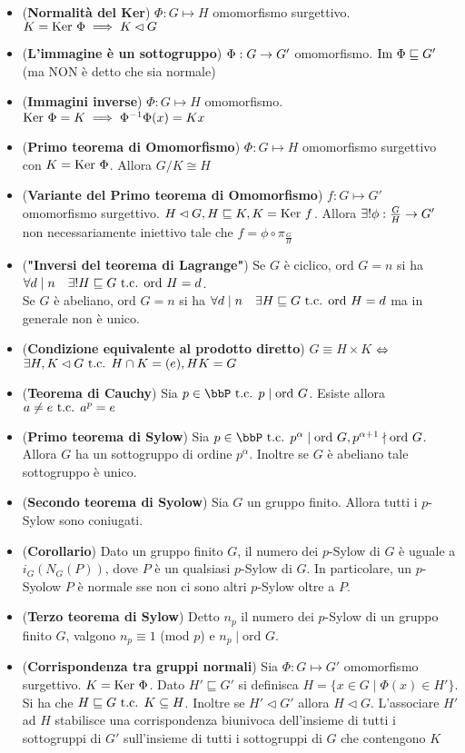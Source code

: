 \documentclass[a4paper,NoNotes,GeneralMath]{stdmdoc}
\newcommand{\Ord}{\text{ord }}
\newcommand{\sgr}{\sqsubseteq}
\newcommand{\nrm}{\lhd}
\newcommand{\isom}{\equiv}
\begin{document}
\begin{itemize}
		\item ({\bf Normalità del Ker}) $\Phi: G \mapsto H$ omomorfismo surgettivo. $K = \Ker \Phi \implies K \nrm G$
		\item ({\bf L'immagine è un sottogruppo}) $\Phi: G \rightarrow G'$ omomorfismo. $\Img \Phi \sgr G'$ (ma NON è detto che sia normale)
		\item ({\bf Immagini inverse}) $\Phi: G \mapsto H$ omomorfismo. $\mbox{Ker } \Phi = K \implies \Phi^{-1}\Phi(x) = Kx$
		\item ({\bf Primo teorema di Omomorfismo}) $\Phi: G \mapsto H$ omomorfismo surgettivo con $K = \mbox{Ker } \Phi$. Allora $G/K \cong H$
		\item ({\bf Variante del Primo teorema di Omomorfismo}) $f: G \mapsto G'$ omomorfismo surgettivo. $H \nrm G, H \sgr K, K = \Ker f$. Allora $\exists ! \phi: \frac{G}{H} \rightarrow G'$ non necessariamente iniettivo tale che $f = \phi \circ \pi_{\frac{G}{H}}$
		\item ({\bf "Inversi del teorema di Lagrange"}) Se $G$ è ciclico, $\Ord G = n$ si ha $\forall d \mid n \quad \exists ! H \sgr G \tc \Ord H = d$. \\ Se $G$ è abeliano, $\Ord G = n$ si ha $\forall d \mid n \quad \exists H \sgr G \tc \Ord H = d$ ma in generale non è unico.
		\item ({\bf Condizione equivalente al prodotto diretto}) $G \isom H \times K$ $\Leftrightarrow$ $\exists H, K \nrm G \tc H\cap K = (e), HK = G$
		\item ({\bf Teorema di Cauchy}) Sia $p \in \bbP \tc p \mid \Ord G$. Esiste allora $a \neq e \mbox{ t.c. } a^p = e$
		\item ({\bf Primo teorema di Sylow}) Sia $p \in \bbP \tc p^\alpha \mid \Ord G, p^{\alpha + 1} \nmid \Ord G$. Allora $G$ ha un sottogruppo di ordine $p^\alpha$. Inoltre se $G$ è abeliano tale sottogruppo è unico.
		\item ({\bf Secondo teorema di Syolow}) Sia $G$ un gruppo finito. Allora tutti i $p$-Sylow sono coniugati.
		\item ({\bf Corollario}) Dato un gruppo finito $G$, il numero dei $p$-Sylow di $G$ è uguale a $i_{G}(N_{G}(P))$, dove $P$ è un qualsiasi $p$-Sylow di $G$. In particolare, un $p$-Syolow $P$ è normale sse non ci sono altri $p$-Sylow oltre a $P$.
		\item ({\bf Terzo teorema di Sylow}) Detto $n_{p}$ il numero dei $p$-Sylow di un gruppo finito $G$, valgono $n_p \equiv 1$ (mod $p$) e $n_p \mid \Ord G$.   
		\item ({\bf Corrispondenza tra gruppi normali}) Sia $\Phi: G \mapsto G'$ omomorfismo surgettivo. $K = \mbox{Ker } \Phi$. Dato $H' \sgr G'$ si definisca $H = \{x\in G \mid \Phi(x) \in H'\}$. \\ Si ha che $H \sgr G \tc K \subseteq H$. Inoltre se $H' \nrm G'$ allora $H \nrm G$. L'associare $H'$ ad $H$ stabilisce una corrispondenza biunivoca dell'insieme di tutti i sottogruppi di $G'$ sull'insieme di tutti i sottogruppi di $G$ che contengono $K$

\end{itemize}
\end{document}
